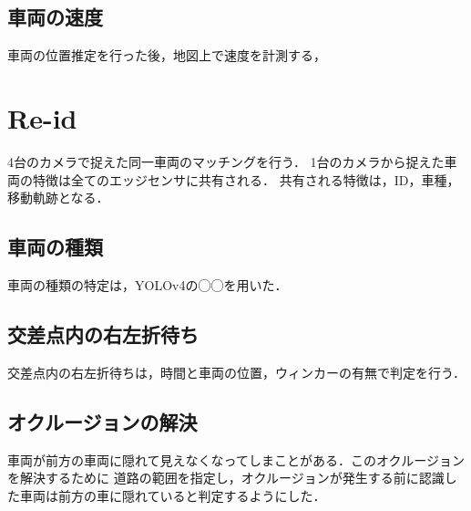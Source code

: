 
\subsection{車両の速度}
車両の位置推定を行った後，地図上で速度を計測する，

\section{Re-id}
4台のカメラで捉えた同一車両のマッチングを行う．
1台のカメラから捉えた車両の特徴は全てのエッジセンサに共有される．
共有される特徴は，ID，車種，移動軌跡となる．


\subsection{車両の種類}
車両の種類の特定は，YOLOv4の◯◯を用いた．
  
\subsection{交差点内の右左折待ち}
交差点内の右左折待ちは，時間と車両の位置，ウィンカーの有無で判定を行う．


\subsection{オクルージョンの解決}
車両が前方の車両に隠れて見えなくなってしまことがある．このオクルージョンを解決するために
道路の範囲を指定し，オクルージョンが発生する前に認識した車両は前方の車に隠れていると判定するようにした．


\newpage
